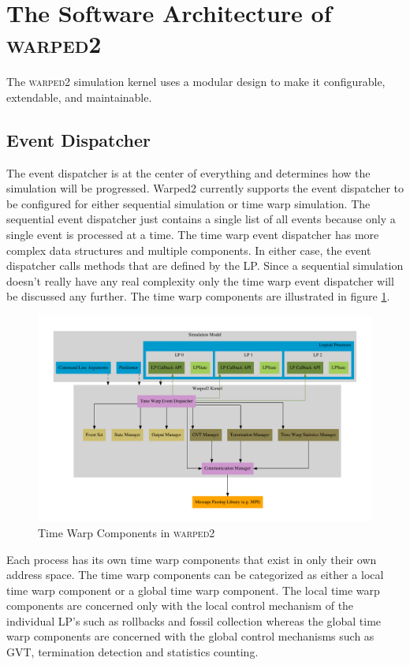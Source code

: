 \documentclass[11pt]{book}
\begin{document}
\section{The Software Architecture of \textsc{warped2}}

The \textsc{warped2} simulation kernel uses a modular design to make it configurable,
extendable, and maintainable.

\subsection{Event Dispatcher}

The event dispatcher is at the center of everything and determines how the simulation will
be progressed. Warped2 currently supports the event dispatcher to be configured for either
sequential simulation or time warp simulation. The sequential event dispatcher just contains
a single list of all events because only a single event is processed at a time. The time warp
event dispatcher has more complex data structures and multiple components. In either case,
the event dispatcher calls methods that are defined by the LP. Since a sequential simulation
doesn't really have any real complexity only the time warp event dispatcher will be discussed
any further. The time warp components are illustrated in figure \ref{warped2_architecture}.

\begin{figure}[H]
    \centering
    \includegraphics[width=\textwidth]{figs/graphviz/warped2_overview.pdf}
    \caption{Time Warp Components in \textsc{warped2}}\label{warped2_architecture}
\end{figure}

\noindent
Each process has its own time warp components that exist in only their own address space.
The time warp components can be categorized as either a local time warp component or a global
time warp component. The local time warp components are concerned only with the local control
mechanism of the individual LP's such as rollbacks and fossil collection whereas the global
time warp components are concerned with the global control mechanisms such as GVT, termination
detection and statistics counting.
\end{document}

